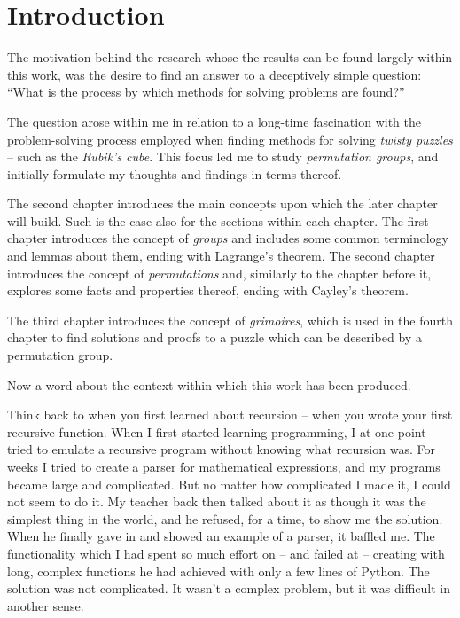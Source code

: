 \documentclass[a4paper,twoside,12pt,openany]{report}
\theoremstyle{plain}
\theoremstyle{definition}
\theoremstyle{remark}
\begin{document}
\tableofcontents


\chapter{Introduction}

The motivation behind the research whose the results can be found largely within this work, was the desire to find an answer to a deceptively simple question: ``What is the process by which methods for solving problems are found?''

The question arose within me in relation to a long-time fascination with the problem-solving process employed when finding methods for solving \textit{twisty puzzles} -- such as the \textit{Rubik's cube}. This focus led me to study \textit{permutation groups}, and initially formulate my thoughts and findings in terms thereof. 

The second chapter introduces the main concepts upon which the later chapter will build. Such is the case also for the sections within each chapter. The first chapter introduces the concept of \textit{groups} and includes some common terminology and lemmas about them, ending with Lagrange's theorem. The second chapter introduces the concept of \textit{permutations} and, similarly to the chapter before it, explores some facts and properties thereof, ending with Cayley's theorem.

The third chapter introduces the concept of \textit{grimoires}, which is used in the fourth chapter to find solutions and proofs to a puzzle which can be described by a permutation group.

Now a word about the context within which this work has been produced.

Think back to when you first learned about recursion -- when you wrote your first recursive function. When I first started learning programming, I at one point tried to emulate a recursive program without knowing what recursion was. For weeks I tried to create a parser for mathematical expressions, and my programs became large and complicated. But no matter how complicated I made it, I could not seem to do it. My teacher back then talked about it as though it was the simplest thing in the world, and he refused, for a time, to show me the solution. When he finally gave in and showed an example of a parser, it baffled me. The functionality which I had spent so much effort on -- and failed at -- creating with long, complex functions he had achieved with only a few lines of Python. The solution was not complicated. It wasn't a complex problem, but it was difficult in another sense. %
\end{document}
